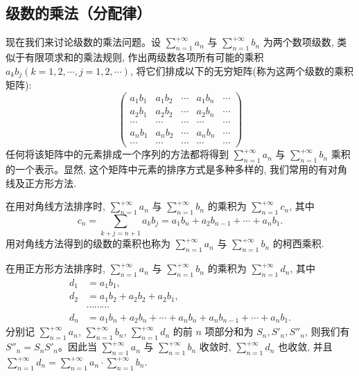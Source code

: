\subsection{级数的乘法（分配律）}
\label{subsec:ma-9-4-3}

现在我们来讨论级数的乘法问题。设 $\sum\limits_{n=1}^{+\infty}a_n$ 与 $\sum\limits_{n=1}^{+\infty}b_n$ 为两个数项级数, 类似于有限项求和的乘法规则, 作出两级数各项所有可能的乘积 $a_kb_j(k=1,2,\cdots,j=1,2,\cdots)$, 将它们排成以下的无穷矩阵(称为这两个级数的乘积矩阵):
\[
  \begin{pmatrix}
    a_1b_1 & a_1b_2 & \cdots & a_1b_n & \cdots\\
    a_2b_1 & a_2b_2 & \cdots & a_2b_n & \cdots\\
    \cdots & \cdots & \cdots & \cdots & \cdots\\
    a_nb_1 & a_nb_2 & \cdots & a_nb_n & \cdots\\
    \cdots & \cdots & \cdots & \cdots & \cdots
  \end{pmatrix}
\]
任何将该矩阵中的元素排成一个序列的方法都将得到 $\sum\limits_{n=1}^{+\infty}a_n$ 与 $\sum\limits_{n=1}^{+\infty}b_n$ 乘积的一个表示。显然, 这个矩阵中元素的排序方式是多种多样的, 我们常用的有对角线及正方形方法.

在用对角线方法排序时, $\sum\limits_{n=1}^{+\infty}a_n$ 与 $\sum\limits_{n=1}^{+\infty}b_n$ 的乘积为 $\sum\limits_{n=1}^{+\infty}c_n$, 其中
\[
  c_n=\sum_{k+j=n+1}a_kb_j=a_1b_n+a_2b_{n-1}+\cdots+a_nb_1.
\]
用对角线方法得到的级数的乘积也称为 $\sum\limits_{n=1}^{+\infty}a_n$ 与 $\sum\limits_{n=1}^{+\infty}b_n$ 的柯西乘积.

在用正方形方法排序时, $\sum\limits_{n=1}^{+\infty}a_n$ 与 $\sum\limits_{n=1}^{+\infty}b_n$ 的乘积为 $\sum\limits_{n=1}^{+\infty}d_n$, 其中
\[
\begin{aligned}
  d_1&=a_1b_1,\\
  d_2&=a_1b_2+a_2b_2+a_2b_1,\\
  &\cdots\cdots\cdots\\
  d_n&=a_1b_n+a_2b_n+\cdots+a_nb_n+a_nb_{n-1}+\cdots+a_nb_1.
\end{aligned}
\]
分别记 $\sum\limits_{n=1}^{+\infty}a_n$, $\sum\limits_{n=1}^{+\infty}b_n$, $\sum\limits_{n=1}^{+\infty}d_n$ 的前 $n$ 项部分和为 $S_n,S'_n,S''_n$, 则我们有 $S''_n=S_nS'_n$。因此当 $\sum\limits_{n=1}^{+\infty}a_n$ 与 $\sum\limits_{n=1}^{+\infty}b_n$ 收敛时, $\sum\limits_{n=1}^{+\infty}d_n$ 也收敛, 并且 $\sum\limits_{n=1}^{+\infty}d_n=\sum\limits_{n=1}^{+\infty}a_n\cdot\sum\limits_{n=1}^{+\infty}b_n$.

